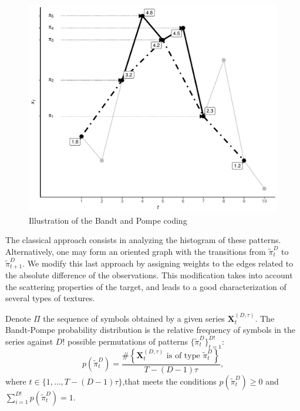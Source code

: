 \documentclass[journal]{IEEEtran}
\begin{document}
\begin{figure}[!ht]
	\centering
	\includegraphics[width=.9\linewidth]{Figures/IntroBP.pdf}
	\caption{Illustration of the Bandt and Pompe coding\label{Fig:IntroBP}}
\end{figure}

The classical approach consists in analyzing the histogram of these patterns.
Alternatively, one may form an oriented graph with the transitions from $\widetilde\pi_t^D$ to $\widetilde\pi_{t+1}^D$. 
We modify this last approach by assigning weights to the edges related to the absolute difference of the observations.
This modification takes into account the scattering properties of the target, and leads to a good characterization of several types of textures.

Denote $\Pi$ the sequence of symbols obtained by a given series $\mathbf{X}_t^{(D,\tau)}$.
The Bandt-Pompe probability distribution is the relative frequency of symbols in the series against $D!$ possible permutations of patterns $\{\widetilde\pi_t^D \}_{t = 1}^{D!}$:
%
\begin{equation}
   p(\widetilde\pi_t^D) = \frac{\#\left \{\mathbf{X}_t^{(D,\tau)} \text{ is of type } \widetilde\pi_t^D\right \}}{T- (D-1)\tau},  
\end{equation}
where  $t\in \{1, \dots, T-(D-1)\tau\}$,that meets the conditions $p(\widetilde\pi_t^D) \ge 0$ and  $\sum_{i=1}^{D!} p(\widetilde\pi_t^D) = 1$.
\end{document}
